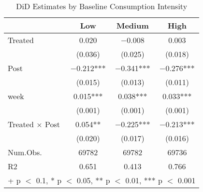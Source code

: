 \begin{table}
\centering
\caption{DiD Estimates by Baseline Consumption Intensity \label{tab:did_by_consumption_terciles}}
\centering
\begin{tabular*}{\textwidth}{@{\extracolsep{\fill}}lccc}
\toprule
  & Low & Medium & High\\
\midrule
Treated & \num{0.020} & \num{-0.008} & \num{0.003}\\
 & (\num{0.036}) & (\num{0.025}) & (\num{0.018})\\
Post & \num{-0.212}*** & \num{-0.341}*** & \num{-0.276}***\\
 & (\num{0.015}) & (\num{0.013}) & (\num{0.011})\\
week & \num{0.015}*** & \num{0.038}*** & \num{0.033}***\\
 & (\num{0.001}) & (\num{0.001}) & (\num{0.001})\\
Treated × Post & \num{0.054}** & \num{-0.225}*** & \num{-0.213}***\\
 & (\num{0.020}) & (\num{0.017}) & (\num{0.016})\\
\midrule
Num.Obs. & \num{69782} & \num{69782} & \num{69736}\\
R2 & \num{0.651} & \num{0.413} & \num{0.766}\\
\bottomrule
\multicolumn{4}{l}{\rule{0pt}{1em}+ p $<$ 0.1, * p $<$ 0.05, ** p $<$ 0.01, *** p $<$ 0.001}\\
\end{tabular*}
\end{table}
